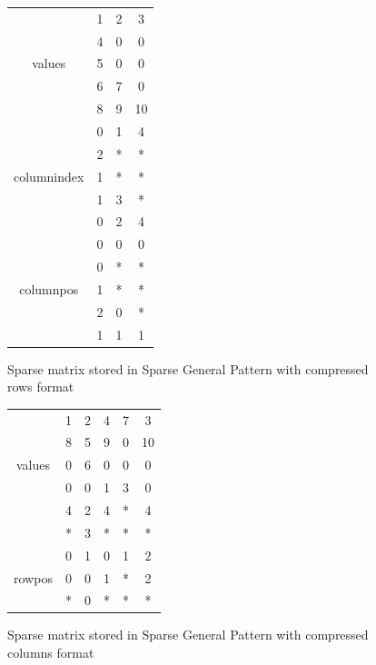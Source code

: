 \begin{figure}
\centering
\begin{tabular}{c|ccc|}
	\cline{2-4}
	  \multirow{5}{*}{values}    & 1 & 2 & 3  \\
	                             & 4 & 0 & 0  \\
	                             & 5 & 0 & 0  \\
	                             & 6 & 7 & 0  \\
	                             & 8 & 9 & 10 \\ \cline{2-4}
	\multirow{5}{*}{columnindex} & 0 & 1 & 4  \\
	                             & 2 & * & *  \\
	                             & 1 & * & *  \\
	                             & 1 & 3 & *  \\
	                             & 0 & 2 & 4  \\ \cline{2-4}
	 \multirow{5}{*}{columnpos}  & 0 & 0 & 0  \\
	                             & 0 & * & *  \\
	                             & 1 & * & *  \\
	                             & 2 & 0 & *  \\
	                             & 1 & 1 & 1  \\ \cline{2-4}
\end{tabular}
\caption{Sparse matrix stored in Sparse General Pattern with compressed rows format \label{fig:methods:sgpr_ex}}
\end{figure}


\begin{figure}
\centering
\begin{tabular}{c|ccccc|}
	\cline{2-6}
	 \multirow{5}{*}{values}  & 1 & 2 & 4 & 7 & 3  \\
	                          & 8 & 5 & 9 & 0 & 10 \\
	                          & 0 & 6 & 0 & 0 & 0  \\ \cline{2-6}
	\multirow{5}{*}{rowindex} & 0 & 0 & 1 & 3 & 0  \\
	                          & 4 & 2 & 4 & * & 4  \\
	                          & * & 3 & * & * & *  \\ \cline{2-6}
	 \multirow{5}{*}{rowpos}  & 0 & 1 & 0 & 1 & 2  \\
	                          & 0 & 0 & 1 & * & 2  \\
	                          & * & 0 & * & * & *  \\ \cline{2-6}
\end{tabular}
\caption{Sparse matrix stored in Sparse General Pattern with compressed columns format \label{fig:methods:sgpc_ex}}
\end{figure}


